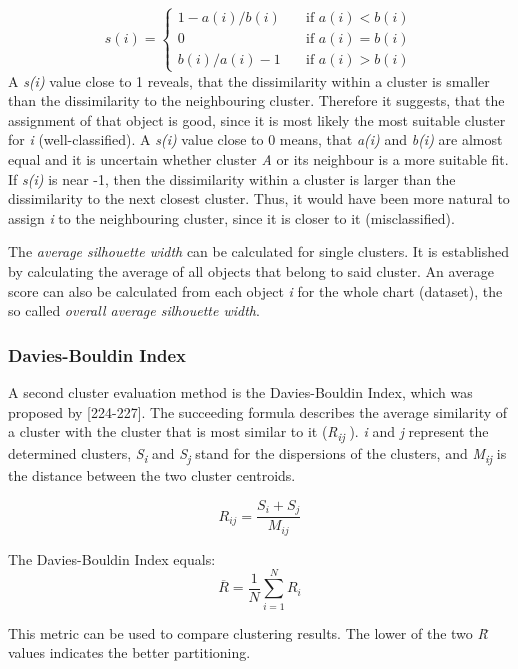 \[ s(i) =
\begin{cases}
  1 - a(i)/b(i)       & \quad \text{if } a(i) < b(i)\\
  0       & \quad \text{if } a(i) = b(i)\\
b(i)/a(i) - 1      & \quad \text{if } a(i) > b(i)

\end{cases}
\]
A \textit{s(i)} value close to 1 reveals, that the dissimilarity within a cluster is smaller than the dissimilarity to the neighbouring cluster. Therefore it suggests, that the assignment of that object is good, since it is most likely the most suitable cluster for \textit{i} (well-classified). A \textit{s(i)} value close to 0 means, that \textit{a(i)} and \textit{b(i)} are almost equal and it is uncertain whether cluster \textit{A} or its neighbour is a more suitable fit. If \textit{s(i)} is near -1, then the dissimilarity within a cluster is larger than the dissimilarity to the next closest cluster. Thus, it would have been more natural to assign \textit{i} to the neighbouring cluster, since it is closer to it (misclassified).

The \textit{average silhouette width} can be calculated for single clusters. It is established by calculating the average of all objects that belong to said cluster. An average score can also be calculated from each object \textit{i} for the whole chart (dataset), the so called \textit{overall average silhouette width}. 


\subsubsection{Davies-Bouldin Index}
A second cluster evaluation method is the Davies-Bouldin Index, which was proposed by \textcite{DaviesBouldin}[224-227]. The succeeding formula describes the average similarity of a cluster with the cluster that is most similar to it (\textit{R\textsubscript{ij}} ).
\textit{i} and \textit{j} represent the determined clusters, \textit{S\textsubscript{i}} and \textit{S\textsubscript{j}} stand for the dispersions of the clusters, and \textit{M\textsubscript{ij}} is the distance between the two cluster centroids. 

\[
R_{ij} = \frac{S_i + S_j}{M_{ij}}  
\]

The Davies-Bouldin Index equals:
\[
\overline{R} = \frac{1}{N}\sum_{i=1}^{N}R_i
\]

This metric can be used to compare clustering results. The lower of the two \textit{\=R} values indicates the better partitioning.

